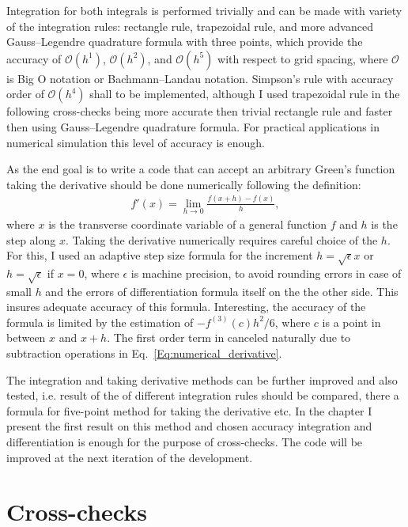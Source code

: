     Integration for both integrals is performed trivially and can be made with variety of the integration rules: rectangle rule, trapezoidal rule, and more advanced Gauss–Legendre quadrature formula with three points, which provide the accuracy of $\mathcal{O}(h^{1})$, $\mathcal{O}(h^{2})$, and $\mathcal{O}(h^{5})$ with respect to grid spacing, where $\mathcal{O}$ is Big O notation or Bachmann–Landau notation. Simpson's rule with accuracy order of $\mathcal{O}(h^{4})$ shall to be implemented, although I used trapezoidal rule in the following cross-checks being more accurate then trivial rectangle rule and faster then using Gauss–Legendre quadrature formula. For practical applications in numerical simulation this level of accuracy is enough.

  

    As the end goal is to write a code that can accept an arbitrary Green's function taking the derivative should be done numerically following the definition:
        \begin{align}
           f'(x) = \lim_{h \to 0} \frac{f(x + h) - f(x)}{h}, 
           \label{Eq:numerical_derivative}
        \end{align}
    where $x$ is the transverse coordinate variable of a general function $f$ and $h$ is the step along $x$. Taking the derivative numerically requires careful choice of the $h$. For this, I used an adaptive step size formula for the increment $h = \sqrt{\epsilon} x$ or $h = \sqrt{\epsilon}$ if $x = 0$, where $\epsilon$ is machine precision, to avoid rounding errors in case of small $h$ and the errors of differentiation formula itself on the the other side. This insures adequate accuracy of this formula. Interesting, the accuracy of the formula is limited by the estimation of $-f^{(3)}(c) h^2 / 6$, where $c$ is a point in between $x$ and $x + h$. The first order term in canceled naturally due to subtraction operations in Eq.~\ref{Eq:numerical_derivative}. 

    The integration and taking derivative methods can be further improved and also tested, i.e. result of the of different integration rules should be compared, there a formula for five-point method for taking the derivative etc. In the chapter I present the first result on this method and chosen accuracy integration and differentiation is enough for the purpose of cross-checks. The code will be improved at the next iteration of the development.
    
\section{Cross-checks}


